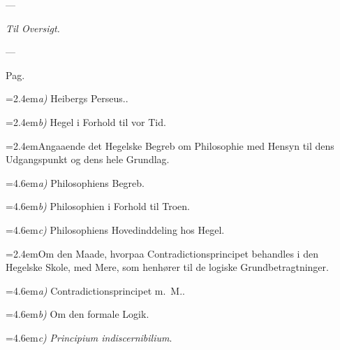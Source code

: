 \documentclass[12pt,a4paper]{book}
\begin{document}
\begin{center}---\end{center}

\clearpage
\thispagestyle{empty}%
\markboth{}{}%
\vspace*{1.5cm}
\begin{center}
{\Large\emph{Til Oversigt.}}
\end{center}
\medskip
\begin{center}---\end{center}
\bigskip

\begingroup
\setlength{\parindent}{0pt}%
\small
\hfill Pag.\par
\medskip
\hangindent=2.4em\hspace*{2.4em}\textit{a)} Heibergs Perseus..\par\smallskip
\hangindent=2.4em\hspace*{2.4em}\textit{b)} Hegel i Forhold til vor Tid.\par\smallskip
\hangindent=2.4emAngaaende det Hegelske Begreb om Philosophie med Hensyn til dens Udgangspunkt og dens hele Grundlag.\par\smallskip
\hangindent=4.6em\hspace*{2.4em}\textit{a)} Philosophiens Begreb.\par\smallskip
\hangindent=4.6em\hspace*{2.4em}\textit{b)} Philosophien i Forhold til Troen.\par\smallskip
\hangindent=4.6em\hspace*{2.4em}\textit{c)} Philosophiens Hovedinddeling hos Hegel.\par\smallskip
\hangindent=2.4emOm den Maade, hvorpaa Contradictionsprincipet behandles i den Hegelske Skole, med Mere, som henhører til de logiske Grundbetragtninger.\par\smallskip
\hangindent=4.6em\hspace*{2.4em}\textit{a)} Contradictionsprincipet m.\ M..\par\smallskip
\hangindent=4.6em\hspace*{2.4em}\textit{b)} Om den formale Logik.\par\smallskip
\hangindent=4.6em\hspace*{2.4em}\textit{c)} \textit{Principium indiscernibilium}.\par\smallskip
\end{document}
